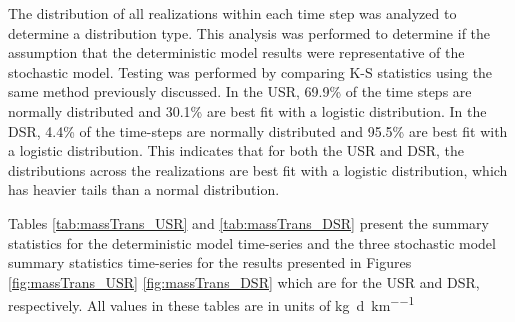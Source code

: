 \begin{linenumbers}
The distribution of all realizations within each time step was analyzed to determine a distribution type.  This analysis was performed to determine if the assumption that the deterministic model results were representative of the stochastic model.  Testing was performed by comparing K-S statistics using the same method previously discussed.  In the USR,  69.9\% of the time steps are normally distributed and 30.1\% are best fit with a logistic distribution.  In the DSR, 4.4\% of the time-steps are normally distributed and 95.5\% are best fit with a logistic distribution.  This indicates that for both the USR and DSR, the distributions across the realizations are best fit with a logistic distribution, which has heavier tails than a normal distribution. 

Tables \ref{tab:massTrans_USR} and \ref{tab:massTrans_DSR} present the summary statistics for the deterministic model time-series and the three stochastic model summary statistics time-series for the results presented in Figures \ref{fig:massTrans_USR} \ref{fig:massTrans_DSR} which are for the USR and DSR, respectively.  All values in these tables are in units of \si{\kilo\gram\per\day\per\kilo\meter}


\end{linenumbers}
